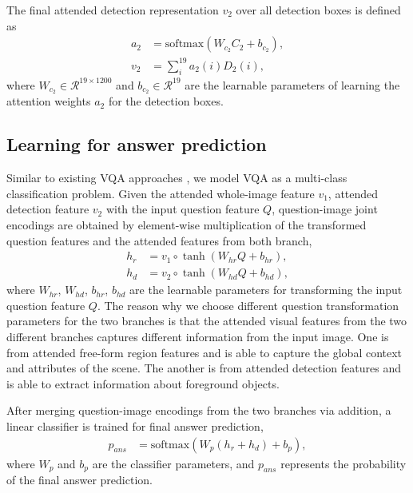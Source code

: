 \documentclass[letterpaper]{article}
\begin{document}
{The final attended detection representation $v_2$ over all detection boxes is defined as
\begin{align}
a_2 & = \mathrm{softmax}(W_{c_2} C_2+b_{c_2}), \\
v_2 & =  \sum_{i}^{19}a_2(i) {D_2}(i), 
\end{align}
where $W_{c_2} \in  \mathcal{R}^{19 \times 1200}$ and $b_{c_2} \in \mathcal{R}^{19}$ are the learnable parameters of learning the attention weights $a_2$ for the detection boxes.


\subsection{Learning for answer prediction}\label{34}

Similar to existing VQA approaches \cite{antol2015vqa,lu2016hierarchical,fukui2016multimodal}, we model VQA as a multi-class classification problem. Given the attended whole-image feature $v_1$, attended detection feature $v_2$ with the input question feature $Q$, question-image joint encodings are obtained by element-wise multiplication of the transformed question features and the attended features from both branch,
\begin{align}
	h_r & = v_1 \circ \tanh(W_{hr}Q+b_{hr}), \\
	h_d & = v_2 \circ \tanh(W_{hd}Q+b_{hd}),
\end{align}
where $W_{hr}$, $W_{hd}$, $b_{hr}$, $b_{hd}$ are the learnable parameters for transforming the input question feature $Q$. The reason why we choose different question transformation parameters for the two branches is that the attended visual features from the two different branches captures different information from the input image. One is from attended free-form region features and is able to capture the global context and attributes of the scene. The another is from attended detection features and is able to extract information about foreground objects.

After merging question-image encodings from the two branches via addition, a linear classifier is trained for final answer prediction,
\begin{align}
p_{ans} &= \mathrm{softmax}(W_p(h_r+h_d)+b_{p}), \label{eq:19}
\end{align}
where $W_p$ and $b_p$ are the classifier parameters, and $p_{ans}$ represents the probability of the final answer prediction.





}
\end{document}
